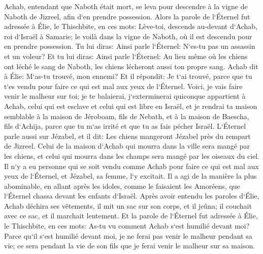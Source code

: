 \verse Achab, entendant que Naboth était mort, se leva pour descendre à la vigne de Naboth de Jizreel, afin d`en prendre possession. 
\verse Alors la parole de l`Éternel fut adressée à Élie, le Thischbite, en ces mots: 
\verse Lève-toi, descends au-devant d`Achab, roi d`Israël à Samarie; le voilà dans la vigne de Naboth, où il est descendu pour en prendre possession. 
\verse Tu lui diras: Ainsi parle l`Éternel: N`es-tu pas un assassin et un voleur? Et tu lui diras: Ainsi parle l`Éternel: Au lieu même où les chiens ont léché le sang de Naboth, les chiens lécheront aussi ton propre sang. 
\verse Achab dit à Élie: M`as-tu trouvé, mon ennemi? Et il répondit: Je t`ai trouvé, parce que tu t`es vendu pour faire ce qui est mal aux yeux de l`Éternel. 
\verse Voici, je vais faire venir le malheur sur toi; je te balaierai, j`exterminerai quiconque appartient à Achab, celui qui est esclave et celui qui est libre en Israël, 
\verse et je rendrai ta maison semblable à la maison de Jéroboam, fils de Nebath, et à la maison de Baescha, fils d`Achija, parce que tu m`as irrité et que tu as fais pécher Israël. 
\verse L`Éternel parle aussi sur Jézabel, et il dit: Les chiens mangeront Jézabel près du rempart de Jizreel. 
\verse Celui de la maison d`Achab qui mourra dans la ville sera mangé par les chiens, et celui qui mourra dans les champs sera mangé par les oiseaux du ciel. 
\verse Il n`y a eu personne qui se soit vendu comme Achab pour faire ce qui est mal aux yeux de l`Éternel, et Jézabel, sa femme, l`y excitait. 
\verse Il a agi de la manière la plus abominable, en allant après les idoles, comme le faisaient les Amoréens, que l`Éternel chassa devant les enfants d`Israël. 
\verse Après avoir entendu les paroles d`Élie, Achab déchira ses vêtements, il mit un sac sur son corps, et il jeûna; il couchait avec ce sac, et il marchait lentement. 
\verse Et la parole de l`Éternel fut adressée à Élie, le Thischbite, en ces mots: 
\verse As-tu vu comment Achab s`est humilié devant moi? Parce qu`il s`est humilié devant moi, je ne ferai pas venir le malheur pendant sa vie; ce sera pendant la vie de son fils que je ferai venir le malheur sur sa maison. 

\chapter{}

